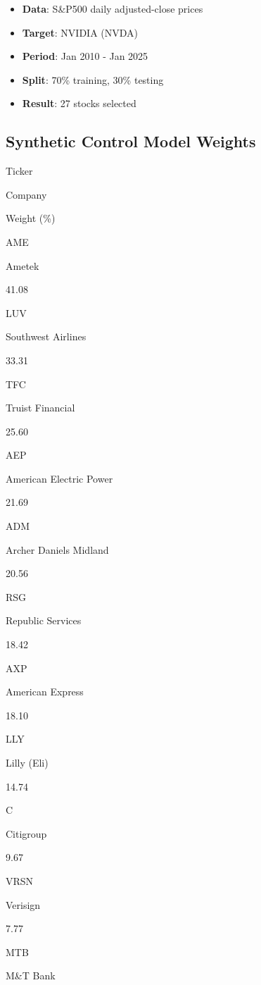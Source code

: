 \documentclass[
  letterpaper,
  DIV=11,
  numbers=noendperiod]{scrartcl}
\providecommand{\tightlist}{%
  \setlength{\itemsep}{0pt}\setlength{\parskip}{0pt}}\usepackage{longtable,booktabs,array}
\begin{document}
\begin{itemize}
\tightlist
\item
  \textbf{Data}: S\&P500 daily adjusted-close prices
\item
  \textbf{Target}: NVIDIA (NVDA)
\item
  \textbf{Period}: Jan 2010 - Jan 2025
\item
  \textbf{Split}: 70\% training, 30\% testing
\item
  \textbf{Result}: 27 stocks selected
\end{itemize}

\subsection{Synthetic Control Model
Weights}\label{synthetic-control-model-weights}

Ticker

Company

Weight (\%)

AME

Ametek

41.08

LUV

Southwest Airlines

33.31

TFC

Truist Financial

25.60

AEP

American Electric Power

21.69

ADM

Archer Daniels Midland

20.56

RSG

Republic Services

18.42

AXP

American Express

18.10

LLY

Lilly (Eli)

14.74

C

Citigroup

9.67

VRSN

Verisign

7.77

MTB

M\&T Bank
\end{document}
